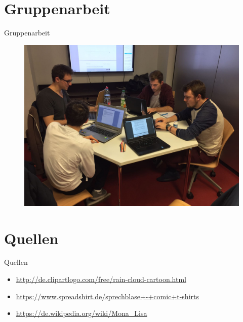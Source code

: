 \documentclass[19pt]{beamer}
\begin{document}
\section{Gruppenarbeit}
\begin{frame}{Gruppenarbeit}
	\begin{figure}
		\begin{center}
			\includegraphics[scale=0.16]{resources/Gruppenarbeit} 
		\end{center}
	\end{figure}	 
\end{frame}

\section{Quellen}
\begin{frame}{Quellen}
	\begin{itemize}
		\item \url{http://de.clipartlogo.com/free/rain-cloud-cartoon.html}
		\item \url{https://www.spreadshirt.de/sprechblase+-+comic+t-shirts}
		\item \url{https://de.wikipedia.org/wiki/Mona_Lisa}
	\end{itemize}
\end{frame}
\end{document}
